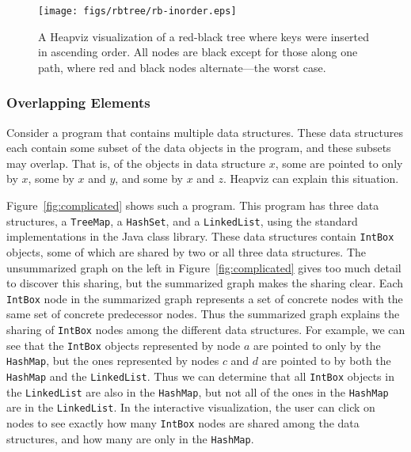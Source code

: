 \begin{figure}
  \texttt{[image: figs/rbtree/rb-inorder.eps]}
  \caption{A Heapviz visualization of a red-black tree where keys were 
  inserted in ascending order. All nodes are black except for those along
  one path, where red and black nodes alternate---the worst case.}
  \label{fig:rb-inorder}
\end{figure}

\subsubsection{Overlapping Elements}
\label{overlap}

Consider a program that contains multiple data structures.  These data
structures each contain some subset of the data objects in the program,
and these subsets may overlap.  That is, of the objects in data structure 
$x$, some are pointed to only by $x$, some by $x$ and $y$, and some by 
$x$ and $z$.  Heapviz can explain this situation.

Figure~\ref{fig:complicated} shows
such a program.  This program has three data structures, a \texttt{TreeMap}, 
a \texttt{HashSet}, and a \texttt{LinkedList}, using the standard 
implementations in the Java class library.  These data structures contain
\texttt{IntBox} objects, some of which are shared by two or all three 
data structures.  The unsummarized graph on the left in 
Figure~\ref{fig:complicated} gives too much detail to discover this sharing, 
but the summarized graph makes the sharing
clear.  Each \texttt{IntBox} node in the summarized graph represents a set 
of concrete nodes with the same set of concrete predecessor nodes.  Thus 
the summarized graph explains the sharing of \texttt{IntBox} nodes among
the different data structures.  For example, we can see that the 
\texttt{IntBox} objects represented by node $a$ are pointed to only by
the \texttt{HashMap}, but the ones represented by nodes $c$ and $d$
are pointed to by both the \texttt{HashMap} and the \texttt{LinkedList}.
Thus we can determine that all \texttt{IntBox} objects in the 
\texttt{LinkedList} are also in the \texttt{HashMap}, but not all of the 
ones in the \texttt{HashMap} are in the \texttt{LinkedList}.  In the 
interactive visualization, the user can click on nodes to see exactly how many 
\texttt{IntBox} nodes are shared among the data structures, and how many are 
only in the \texttt{HashMap}.

